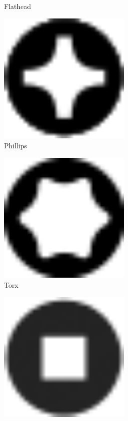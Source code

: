 \documentclass[10pt,letterpaper]{book}
\begin{document}
\begin{figure}[H]
\begin{subfigure}[b]{.15\linewidth}
			\caption{Flathead}
		\end{subfigure}\begin{subfigure}[b]{.15\linewidth}
			\includegraphics[width=0.7\textwidth]{imgs/head_phil.png}
			\caption{Phillips}
		\end{subfigure}\begin{subfigure}[b]{.15\linewidth}
			\includegraphics[width=0.7\textwidth]{imgs/head_torx.png}
			\caption{Torx}
		\end{subfigure}\begin{subfigure}[b]{.15\linewidth}
			\includegraphics[width=0.7\textwidth]{imgs/head_robertson.png}

\end{subfigure}
\end{figure}
\end{document}
